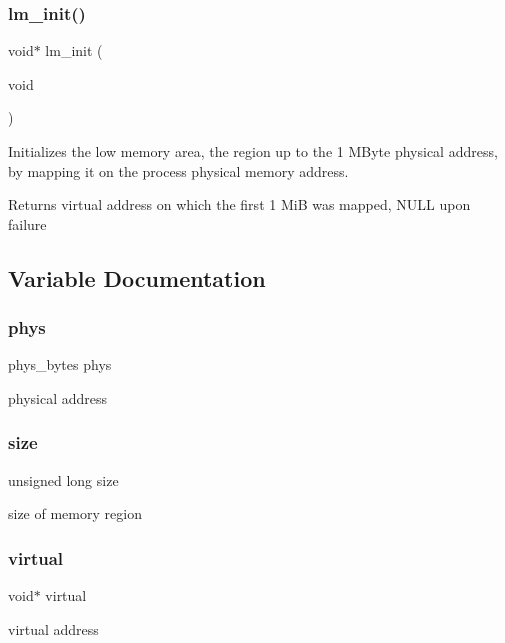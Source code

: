\subsubsection{\texorpdfstring{lm\+\_\+init()}{lm\_init()}}
{\footnotesize\ttfamily void$\ast$ lm\+\_\+init (\begin{DoxyParamCaption}\item[{void}]{ }\end{DoxyParamCaption})}



Initializes the low memory area, the region up to the 1 M\+Byte physical address, by mapping it on the process\textquotesingle{} physical memory address. 

\begin{DoxyReturn}{Returns}
virtual address on which the first 1 MiB was mapped, N\+U\+LL upon failure 
\end{DoxyReturn}


\subsection{Variable Documentation}
\hypertarget{group__lmlib_gab7a85fe0db943529016cf606e3a7167f}{}\label{group__lmlib_gab7a85fe0db943529016cf606e3a7167f} 
\subsubsection{\texorpdfstring{phys}{phys}}
{\footnotesize\ttfamily phys\+\_\+bytes phys}



physical address 

\hypertarget{group__lmlib_ga1e1268d164c38e4f8a4f4eb9058b0601}{}\label{group__lmlib_ga1e1268d164c38e4f8a4f4eb9058b0601} 
\subsubsection{\texorpdfstring{size}{size}}
{\footnotesize\ttfamily unsigned long size}



size of memory region 

\hypertarget{group__lmlib_ga6a0ea2231d30f2b025e0c4b9f12dd6db}{}\label{group__lmlib_ga6a0ea2231d30f2b025e0c4b9f12dd6db} 
\subsubsection{\texorpdfstring{virtual}{virtual}}
{\footnotesize\ttfamily void$\ast$ virtual}



virtual address 

